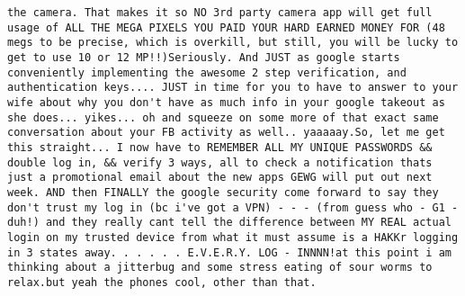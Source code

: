 \documentclass[
  11pt,
]{article}
\begin{document}
\begin{verbatim}
the camera. That makes it so NO 3rd party camera app will get full usage of ALL THE MEGA PIXELS YOU PAID YOUR HARD EARNED MONEY FOR (48 megs to be precise, which is overkill, but still, you will be lucky to get to use 10 or 12 MP!!)Seriously. And JUST as google starts conveniently implementing the awesome 2 step verification, and authentication keys.... JUST in time for you to have to answer to your wife about why you don't have as much info in your google takeout as she does... yikes... oh and squeeze on some more of that exact same conversation about your FB activity as well.. yaaaaay.So, let me get this straight... I now have to REMEMBER ALL MY UNIQUE PASSWORDS && double log in, && verify 3 ways, all to check a notification thats just a promotional email about the new apps GEWG will put out next week. AND then FINALLY the google security come forward to say they don't trust my log in (bc i've got a VPN) - - - (from guess who - G1 - duh!) and they really cant tell the difference between MY REAL actual login on my trusted device from what it must assume is a HAKKr logging in 3 states away. . . . . . E.V.E.R.Y. LOG - INNNN!at this point i am thinking about a jitterbug and some stress eating of sour worms to relax.but yeah the phones cool, other than that.

\end{verbatim}
\end{document}
